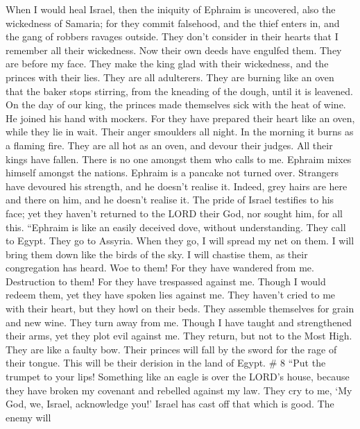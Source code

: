  When I would heal Israel, then the iniquity of Ephraim is
uncovered, also the wickedness of Samaria; for they commit falsehood,
and the thief enters in, and the gang of robbers ravages outside.
 They don't consider in their hearts that I remember all
their wickedness. Now their own deeds have engulfed them. They are
before my face.  They make the king glad with their
wickedness, and the princes with their lies.  They are all
adulterers. They are burning like an oven that the baker stops stirring,
from the kneading of the dough, until it is leavened.  On
the day of our king, the princes made themselves sick with the heat of
wine. He joined his hand with mockers.  For they have
prepared their heart like an oven, while they lie in wait. Their anger
smoulders all night. In the morning it burns as a flaming fire.
 They are all hot as an oven, and devour their judges. All
their kings have fallen. There is no one amongst them who calls to me.
 Ephraim mixes himself amongst the nations. Ephraim is a
pancake not turned over.  Strangers have devoured his
strength, and he doesn't realise it. Indeed, grey hairs are here and
there on him, and he doesn't realise it.  The pride of
Israel testifies to his face; yet they haven't returned to the LORD
their God, nor sought him, for all this.  ``Ephraim is like
an easily deceived dove, without understanding. They call to Egypt. They
go to Assyria.  When they go, I will spread my net on them.
I will bring them down like the birds of the sky. I will chastise them,
as their congregation has heard.  Woe to them! For they
have wandered from me. Destruction to them! For they have trespassed
against me. Though I would redeem them, yet they have spoken lies
against me.  They haven't cried to me with their heart, but
they howl on their beds. They assemble themselves for grain and new
wine. They turn away from me.  Though I have taught and
strengthened their arms, yet they plot evil against me. 
They return, but not to the Most High. They are like a faulty bow. Their
princes will fall by the sword for the rage of their tongue. This will
be their derision in the land of Egypt. \# 8  ``Put the
trumpet to your lips! Something like an eagle is over the LORD's house,
because they have broken my covenant and rebelled against my law.
 They cry to me, `My God, we, Israel, acknowledge you!'
 Israel has cast off that which is good. The enemy will
